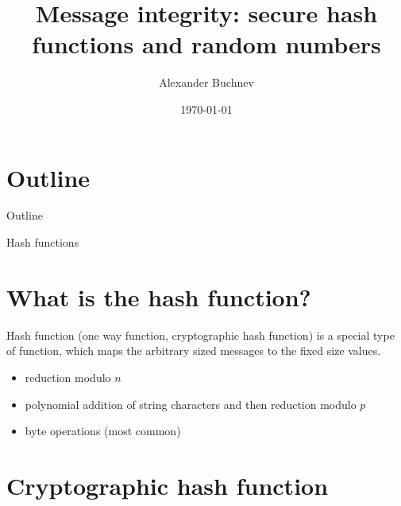 \documentclass{beamer}
\title{Message integrity: secure hash functions and random numbers}
\author{Alexander Buchnev}
\date{\monthYear\today}
\begin{document}
\frame{
	\titlepage
}

\newtheorem{prop}{Proposition}


\section*{Outline}

\begin{frame}{Outline}
	\tableofcontents
\end{frame}

\begin{frame}{Hash functions}
    \section{What is the hash function?}
    \begin{definition}
        Hash function (one way function, cryptographic hash function) is a 
        special type of function, which maps the arbitrary sized messages to 
        the fixed size values. 
    \end{definition}
    \begin{example}
        \begin{itemize}
            \item reduction modulo $n$
            \item polynomial addition of string characters and then reduction 
            modulo $p$
            \item byte operations (most common)
        \end{itemize}
    \end{example}
\end{frame}

\section{Cryptographic hash function}
\end{document}
